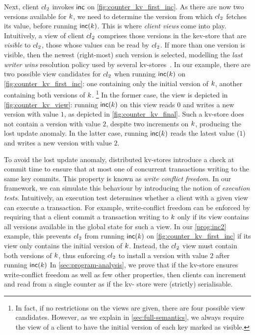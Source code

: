Next, client ${cl}_2$ invokes $\mathsf{inc}$ on \cref{fig:counter_kv_first_inc}. 
As there are now two versions available for $k$, 
we need to determine the version from which ${cl}_2$ fetches its value, before running $\mathsf{inc}(k)$.
This is where \emph{client views} come into play.
Intuitively, a view of client ${cl}_2$ comprises those versions in the kev-store that are \emph{visible} to ${cl}_2$, 
\ie those whose values can be read by ${cl}_2$. 
If more than one version is visible, then the newest (right-most) such version is selected, 
modelling the \emph{last writer wins} resolution policy used by several kv-stores~\cite{vogels:2009:ec:1435417.1435432}. 
In our example, there are two possible view candidates for ${cl}_2$ when running $\mathsf{inc}(k)$ on \cref{fig:counter_kv_first_inc}: 
one containing only the initial version of $k$, 
another containing both versions of $k$.%
\footnote{In fact, if no restrictions on the views are given, there 
are four possible view candidates. 
However, as we explain in \cref{sec:full-semantics}, we always require the view of a client 
to have the initial version of each key marked as visible.}
In the former case, the view is depicted in \cref{fig:counter_kv_view}:
running $\mathsf{inc}(k)$ on this view reads $0$ and writes a new version with value $1$, as depicted in \cref{fig:counter_kv_final}.
Such a kv-store does not contain a version with value $2$, despite two increments on $k$, producing the lost update anomaly.
In the latter case, running $\mathsf{inc}(k)$ reads the latest value ($1$) and writes a new version with value $2$.

To avoid the lost update anomaly, distributed kv-stores introduce a check at commit time to ensure that 
at most one of concurrent transactions writing to the same key commits. 
This property is known as \emph{write conflict freedom}. 
In our framework, we can simulate this behaviour by introducing the notion of \emph{execution tests}. 
Intuitively, an execution test determines whether a client with a given view can execute a transaction. 
For example, write-conflict freedom can be enforced by requiring that a client commit a transaction writing to $k$ 
only if its view contains all versions available in the global state for such a view. 
In our \eqref{prog:inc2} example, this prevents ${cl}_2$ from running $\mathsf{inc}(k)$ on \cref{fig:counter_kv_first_inc}
if its view only contains the initial version of $k$. 
Instead, the ${cl}_2$ view must contain both versions of $k$, 
thus enforcing ${cl}_2$ to install a version with value $2$ after running $\mathsf{inc}(k)$
In \cref{sec:program-analysis}, we prove that if the kv-store 
ensures write-conflict freedom as well as few other properties, then clients can increment 
and read from a single counter as if the kv- store were (strictly) serialisable.

